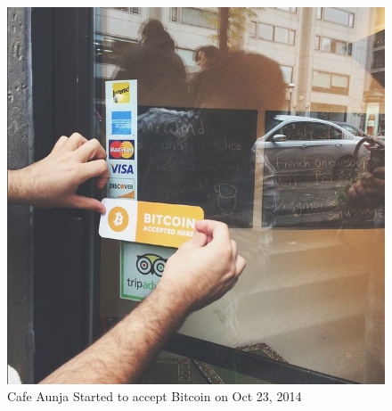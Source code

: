 \begin{figure}[htb]
\centering
\includegraphics[scale=0.5]{fig/cafeaunja.png}
  \caption{Cafe Aunja Started to accept Bitcoin on Oct 23, 2014 }
\label{fig:cafeaunja}
\end{figure}




